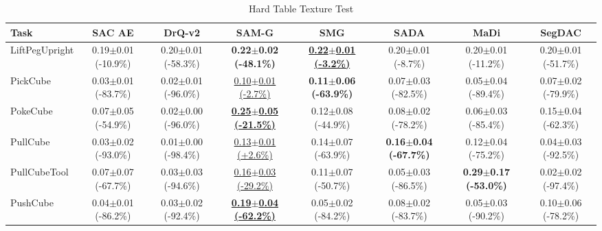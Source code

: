 \begin{table}[htbp]
\centering
\scriptsize
\caption{Hard Table Texture Test}
\label{tab:appendix_tabletexturetest_hard}
\begin{adjustbox}{max width=\textwidth}
\begin{tabular}{l*{7}{c}}
\toprule
\textbf{Task} & \textbf{SAC AE} & \textbf{DrQ-v2} & \textbf{SAM-G} & \textbf{SMG} & \textbf{SADA} & \textbf{MaDi} & \textbf{SegDAC} \\
\midrule
LiftPegUpright & 0.19$\pm$0.01 \scriptsize{(-10.9\%)} & 0.20$\pm$0.01 \scriptsize{(-58.3\%)} & \textbf{0.22$\pm$0.02 \scriptsize{(-48.1\%)}} & \textbf{\underline{0.22$\pm$0.01 \scriptsize{(-3.2\%)}}} & 0.20$\pm$0.01 \scriptsize{(-8.7\%)} & 0.20$\pm$0.01 \scriptsize{(-11.2\%)} & 0.20$\pm$0.01 \scriptsize{(-51.7\%)} \\
PickCube & 0.03$\pm$0.01 \scriptsize{(-83.7\%)} & 0.02$\pm$0.01 \scriptsize{(-96.0\%)} & \underline{0.10$\pm$0.01 \scriptsize{(-2.7\%)}} & \textbf{0.11$\pm$0.06 \scriptsize{(-63.9\%)}} & 0.07$\pm$0.03 \scriptsize{(-82.5\%)} & 0.05$\pm$0.04 \scriptsize{(-89.4\%)} & 0.07$\pm$0.02 \scriptsize{(-79.9\%)} \\
PokeCube & 0.07$\pm$0.05 \scriptsize{(-54.9\%)} & 0.02$\pm$0.00 \scriptsize{(-96.0\%)} & \textbf{\underline{0.25$\pm$0.05 \scriptsize{(-21.5\%)}}} & 0.12$\pm$0.08 \scriptsize{(-44.9\%)} & 0.08$\pm$0.02 \scriptsize{(-78.2\%)} & 0.06$\pm$0.03 \scriptsize{(-85.4\%)} & 0.15$\pm$0.04 \scriptsize{(-62.3\%)} \\
PullCube & 0.03$\pm$0.02 \scriptsize{(-93.0\%)} & 0.01$\pm$0.00 \scriptsize{(-98.4\%)} & \underline{0.13$\pm$0.01 \scriptsize{(+2.6\%)}} & 0.14$\pm$0.07 \scriptsize{(-63.9\%)} & \textbf{0.16$\pm$0.04 \scriptsize{(-67.7\%)}} & 0.12$\pm$0.04 \scriptsize{(-75.2\%)} & 0.04$\pm$0.03 \scriptsize{(-92.5\%)} \\
PullCubeTool & 0.07$\pm$0.07 \scriptsize{(-67.7\%)} & 0.03$\pm$0.03 \scriptsize{(-94.6\%)} & \underline{0.16$\pm$0.03 \scriptsize{(-29.2\%)}} & 0.11$\pm$0.07 \scriptsize{(-50.7\%)} & 0.05$\pm$0.03 \scriptsize{(-86.5\%)} & \textbf{0.29$\pm$0.17 \scriptsize{(-53.0\%)}} & 0.02$\pm$0.02 \scriptsize{(-97.4\%)} \\
PushCube & 0.04$\pm$0.01 \scriptsize{(-86.2\%)} & 0.03$\pm$0.02 \scriptsize{(-92.4\%)} & \textbf{\underline{0.19$\pm$0.04 \scriptsize{(-62.2\%)}}} & 0.05$\pm$0.02 \scriptsize{(-84.2\%)} & 0.08$\pm$0.02 \scriptsize{(-83.7\%)} & 0.05$\pm$0.03 \scriptsize{(-90.2\%)} & 0.10$\pm$0.06 \scriptsize{(-78.2\%)} \\

\end{tabular}
\end{adjustbox}
\end{table}
